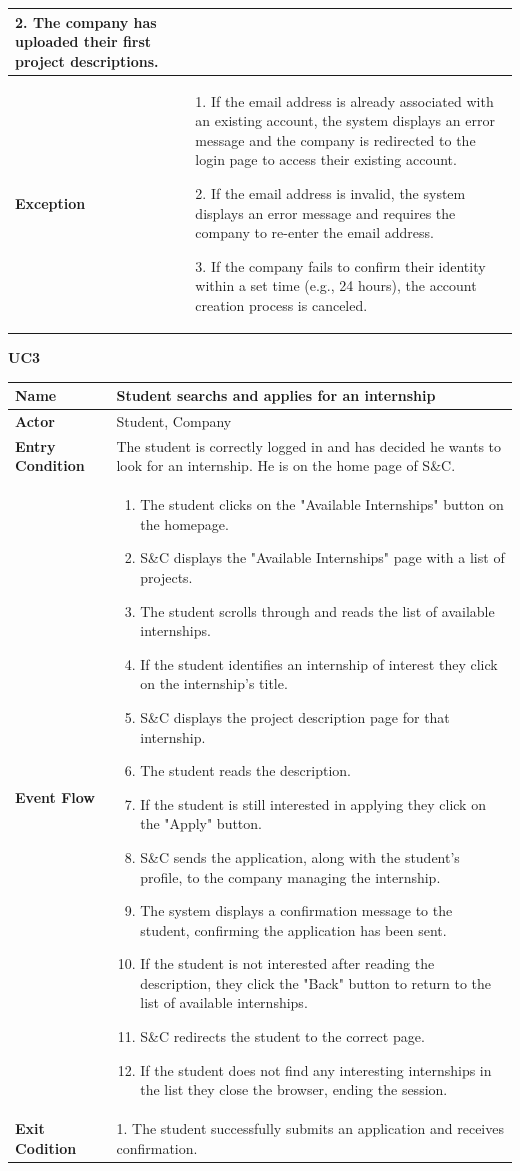 \begin{longtable}{|p{}|p{}|}
2. The company has uploaded their first project descriptions.\\
\hline
\textbf{Exception} & 
1. If the email address is already associated with an existing account, the system displays an error message and the company is redirected to the login page to access their existing account.	

2. If the email address is invalid, the system displays an error message and requires the company to re-enter the email address.	

3. If the company fails to confirm their identity within a set time (e.g., 24 hours), the account creation process is canceled.\\
\hline
\end{longtable}

\textbf{UC3}

\begin{longtable}{|p{}|p{}|}
\hline
\textbf{Name} &  Student searchs and applies for an internship\\
\hline
\textbf{Actor} &  Student, Company\\
\hline
\textbf{Entry Condition} &  The student is correctly logged in and has decided he wants to look for an internship. He is on the home page of S\&C.\\
\hline
\textbf{Event Flow} &  
\begin{enumerate}
    \item  The student clicks on the "Available Internships" button on the homepage.
    \item S\&C displays the "Available Internships" page with a list of projects.
    \item The student scrolls through and reads the list of available internships.
    \item If the student identifies an internship of interest they click on the internship's title.
    \item S\&C displays the project description page for that internship.
    \item The student reads the description.
    \item If the student is still interested in applying they click on the "Apply" button.
    \item S\&C sends the application, along with the student's profile, to the company managing the internship.
    \item The system displays a confirmation message to the student, confirming the application has been sent.
    \item If the student is not interested after reading the description, they click the "Back" button to return to the list of available internships.
    \item S\&C redirects the student to the correct page.
    \item  If the student does not find any interesting internships in the list they close the browser, ending the session.
\end{enumerate} \\
\hline
\textbf{Exit Codition} &  
1. The student successfully submits an application and receives confirmation.


\end{longtable}
